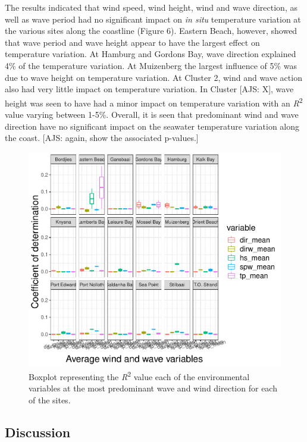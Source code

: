 \documentclass[12pt,a4paper,]{article}
\begin{document}
The results indicated that wind speed, wind height, wind and wave
direction, as well as wave period had no significant impact on \emph{in
situ} temperature variation at the various sites along the coastline
(Figure 6). Eastern Beach, however, showed that wave period and wave
height appear to have the largest effect on temperature variation. At
Hamburg and Gordons Bay, wave direction explained 4\% of the temperature
variation. At Muizenberg the largest influence of 5\% was due to wave
height on temperature variation. At Cluster 2, wind and wave action also
had very little impact on temperature variation. In Cluster {[}AJS:
X{]}, wave height was seen to have had a minor impact on temperature
variation with an \emph{R}\textsuperscript{2} value varying between
1-5\%. Overall, it is seen that predominant wind and wave direction have
no significant impact on the seawater temperature variation along the
coast. {[}AJS: again, show the associated p-values.{]}

\begin{figure}
\centering
\includegraphics{../figures/predominant_ww.pdf}
\caption{Boxplot representing the \emph{R}\textsuperscript{2} value each
of the environmental variables at the most predominant wave and wind
direction for each of the sites.}
\end{figure}

\hypertarget{discussion}{%
\subsection{Discussion}\label{discussion}}
\end{document}

